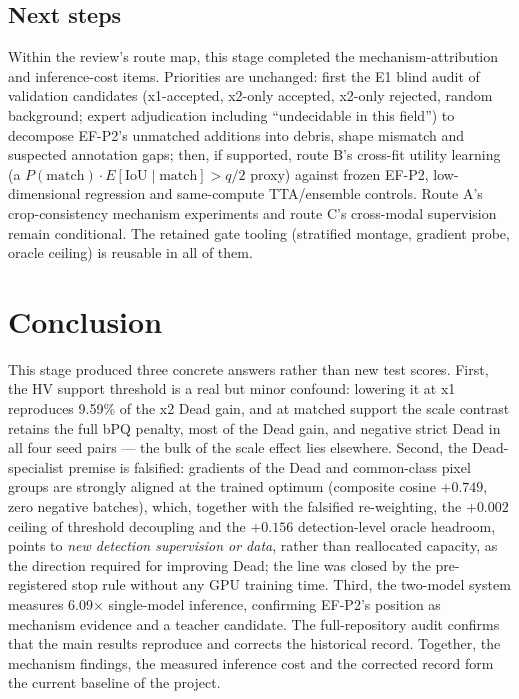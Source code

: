 \documentclass[11pt,a4paper]{article}
\begin{document}
\subsection{Next steps}

Within the review's route map\cite{next}, this stage completed the mechanism-attribution and inference-cost items. Priorities are unchanged: first the E1 blind audit of validation candidates (x1-accepted, x2-only accepted, x2-only rejected, random background; expert adjudication including ``undecidable in this field'') to decompose EF-P2's unmatched additions into debris, shape mismatch and suspected annotation gaps; then, if supported, route B's cross-fit utility learning (a $P(\mathrm{match})\cdot E[\mathrm{IoU}\mid\mathrm{match}]>q/2$ proxy) against frozen EF-P2, low-dimensional regression and same-compute TTA/ensemble controls. Route A's crop-consistency mechanism experiments and route C's cross-modal supervision remain conditional. The retained gate tooling (stratified montage, gradient probe, oracle ceiling) is reusable in all of them.

\section{Conclusion}

This stage produced three concrete answers rather than new test scores. First, the HV support threshold is a real but minor confound: lowering it at x1 reproduces 9.59\% of the x2 Dead gain, and at matched support the scale contrast retains the full bPQ penalty, most of the Dead gain, and negative strict Dead in all four seed pairs --- the bulk of the scale effect lies elsewhere. Second, the Dead-specialist premise is falsified: gradients of the Dead and common-class pixel groups are strongly aligned at the trained optimum (composite cosine $+0.749$, zero negative batches), which, together with the falsified re-weighting, the $+0.002$ ceiling of threshold decoupling and the $+0.156$ detection-level oracle headroom, points to \emph{new detection supervision or data}, rather than reallocated capacity, as the direction required for improving Dead; the line was closed by the pre-registered stop rule without any GPU training time. Third, the two-model system measures 6.09$\times$ single-model inference, confirming EF-P2's position as mechanism evidence and a teacher candidate. The full-repository audit confirms that the main results reproduce and corrects the historical record. Together, the mechanism findings, the measured inference cost and the corrected record form the current baseline of the project.
\end{document}
